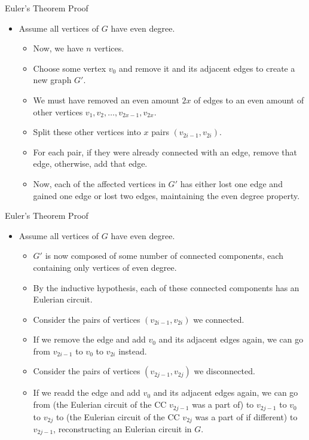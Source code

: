 \documentclass[aspectratio=169, handout]{beamer}
\begin{document}
\begin{frame}{Euler's Theorem Proof}
    \begin{itemize}
        \item Assume all vertices of $G$ have even degree.
        \begin{itemize}
            \item Now, we have $n$ vertices. \pause
            \item Choose some vertex $v_0$ and remove it and its adjacent edges to create a new graph $G'$. \pause
            \item We must have removed an even amount $2x$ of edges to an even amount of other vertices $v_1, v_2, \dots, v_{2x - 1}, v_{2x}$. \pause
            \item Split these other vertices into $x$ pairs $(v_{2i - 1}, v_{2i})$. \pause
            \item For each pair, if they were already connected with an edge, remove that edge, otherwise, add that edge. \pause
            \item Now, each of the affected vertices in $G'$ has either lost one edge and gained one edge or lost two edges, maintaining the even degree property.
        \end{itemize}
    \end{itemize}
\end{frame}

\begin{frame}{Euler's Theorem Proof}
    \begin{itemize}
        \item Assume all vertices of $G$ have even degree.
        \begin{itemize}
            \item $G'$ is now composed of some number of connected components, each containing only vertices of even degree.
            \item By the inductive hypothesis, each of these connected components has an Eulerian circuit. \pause
            \item Consider the pairs of vertices $(v_{2i - 1}, v_{2i})$ we connected. \pause
            \item If we remove the edge and add $v_0$ and its adjacent edges again, we can go from $v_{2i - 1}$ to $v_0$ to $v_{2i}$ instead. \pause
            \item Consider the pairs of vertices $(v_{2j - 1}, v_{2j})$ we disconnected. \pause
            \item If we readd the edge and add $v_0$ and its adjacent edges again, we can go from (the Eulerian circuit of the CC $v_{2j - 1}$ was a part of) to $v_{2j - 1}$ to $v_0$ to $v_{2j}$ to (the Eulerian circuit of the CC $v_{2j}$ was a part of if different) to $v_{2j - 1}$, reconstructing an Eulerian circuit in $G$.
        \end{itemize}
    \end{itemize}
\end{frame}
\end{document}
